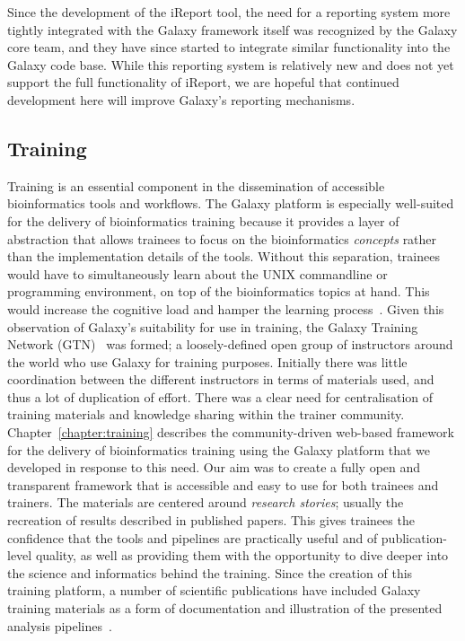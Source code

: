 Since the development of the iReport tool, the need for a reporting system more tightly integrated with the Galaxy framework itself was recognized by the Galaxy core team, and they have since started to integrate similar functionality into the Galaxy code base. While this reporting system is relatively new and does not yet support the full functionality of iReport, we are hopeful that continued development here will improve Galaxy's reporting mechanisms.

\subsection{Training}
Training is an essential component in the dissemination of accessible bioinformatics tools and workflows. The Galaxy platform is especially well-suited for the delivery of bioinformatics training because it provides a layer of abstraction that allows trainees to focus on the bioinformatics \emph{concepts} rather than the implementation details of the tools. Without this separation, trainees would have to simultaneously learn about the UNIX commandline or programming environment, on top of the bioinformatics topics at hand. This would increase the cognitive load and hamper the learning process~\cite{paas2003cognitive}. Given this observation of Galaxy's suitability for use in training, the Galaxy Training Network (GTN)~\cite{url-gtn} was formed; a loosely-defined open group of instructors around the world who use Galaxy for training purposes. Initially there was little coordination between the different instructors in terms of materials used, and thus a lot of duplication of effort. There was a clear need for centralisation of training materials and knowledge sharing within the trainer community. Chapter~\ref{chapter:training} describes the community-driven web-based framework for the delivery of bioinformatics training using the Galaxy platform that we developed in response to this need.
Our aim was to create a fully open and transparent framework that is accessible and easy to use for both trainees and trainers. The materials are centered around \emph{research stories}; usually the recreation of results described in published papers. This gives trainees the confidence that the tools and pipelines are practically useful and of publication-level quality, as well as providing them with the opportunity to dive deeper into the science and informatics behind the training. Since the creation of this training platform, a number of scientific publications have included Galaxy training materials as a form of documentation and illustration of the presented analysis pipelines~\cite{gruning2017rna,blank2018disseminating,batut2017asaim,hiltemann2018galaxy}.

